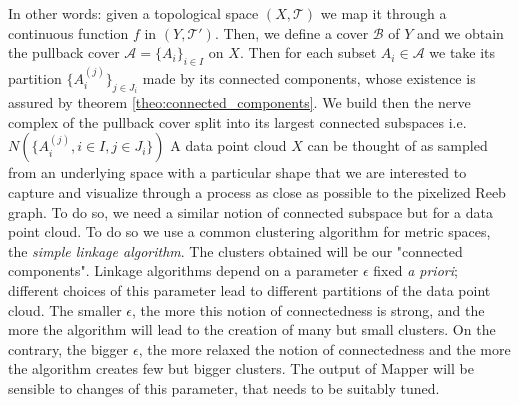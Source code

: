 In other words: given a topological space $(X, \mathcal{T})$ we map it through a continuous function $f$ in $(Y, \mathcal{T}')$. Then, we define a cover $\mathcal{B}$ of $Y$ and we obtain the pullback cover $\mathcal{A} = \{ A_i \}_{i \in I}$ on $X$. Then for each subset $A_i \in \mathcal{A}$ we take its partition $  \{ A_i^{(j)}  \}_{j \in J_i}$ made by its connected components, whose existence is assured by theorem \ref{theo:connected_components}. We build then the nerve complex of the pullback cover split into its largest connected subspaces i.e. $N( \{A_i^{(j)}, i \in I, j \in J_i\} )$\newline
A data point cloud $X$ can be thought of as sampled from an underlying space with a particular shape that we are interested to capture and visualize through a process as close as possible to the pixelized Reeb graph. To do so, we need a similar notion of connected subspace but for a data point cloud. To do so we use a common clustering algorithm for metric spaces, the \textit{simple linkage algorithm}. The clusters obtained will be our "connected components". Linkage algorithms depend on a parameter $\epsilon$ fixed \textit{a priori}; different choices of this parameter lead to different partitions of the data point cloud. The smaller $\epsilon$, the more this notion of connectedness is strong, and the more the algorithm will lead to the creation of many but small clusters. On the contrary, the bigger $\epsilon$, the more relaxed the notion of connectedness and the more the algorithm creates few but bigger clusters. The output of Mapper will be sensible to changes of this parameter, that needs to be suitably tuned.

